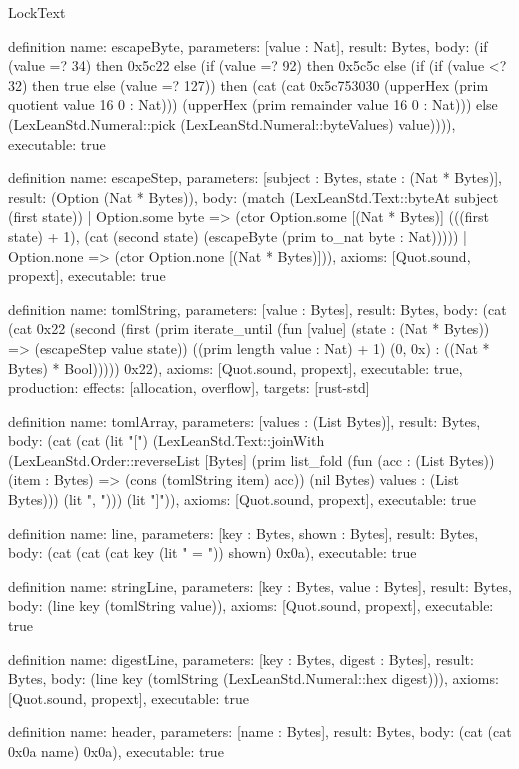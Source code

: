 \begin{lexlean}{LockText}
\begin{semanticmodule}
definition{
  name: escapeByte,
  parameters: [value : Nat],
  result: Bytes,
  body: (if (value =? 34) then 0x5c22 else (if (value =? 92) then 0x5c5c else (if (if (value <? 32) then true else (value =? 127)) then (cat (cat 0x5c753030 (upperHex (prim quotient value 16 0 : Nat))) (upperHex (prim remainder value 16 0 : Nat))) else (LexLeanStd.Numeral::pick (LexLeanStd.Numeral::byteValues) value)))),
  executable: true
}

definition{
  name: escapeStep,
  parameters: [subject : Bytes, state : (Nat * Bytes)],
  result: (Option (Nat * Bytes)),
  body: (match (LexLeanStd.Text::byteAt subject (first state))
    | Option.some byte => (ctor Option.some [(Nat * Bytes)] (((first state) + 1), (cat (second state) (escapeByte (prim to_nat byte : Nat)))))
    | Option.none => (ctor Option.none [(Nat * Bytes)])),
  axioms: [Quot.sound, propext],
  executable: true
}

definition{
  name: tomlString,
  parameters: [value : Bytes],
  result: Bytes,
  body: (cat (cat 0x22 (second (first (prim iterate_until (fun [value] (state : (Nat * Bytes)) => (escapeStep value state)) ((prim length value : Nat) + 1) (0, 0x) : ((Nat * Bytes) * Bool))))) 0x22),
  axioms: [Quot.sound, propext],
  executable: true,
  production: {effects: [allocation, overflow], targets: [rust-std]}
}

definition{
  name: tomlArray,
  parameters: [values : (List Bytes)],
  result: Bytes,
  body: (cat (cat (lit "[") (LexLeanStd.Text::joinWith (LexLeanStd.Order::reverseList [Bytes] (prim list_fold (fun (acc : (List Bytes)) (item : Bytes) => (cons (tomlString item) acc)) (nil Bytes) values : (List Bytes))) (lit ", "))) (lit "]")),
  axioms: [Quot.sound, propext],
  executable: true
}

definition{
  name: line,
  parameters: [key : Bytes, shown : Bytes],
  result: Bytes,
  body: (cat (cat (cat key (lit " = ")) shown) 0x0a),
  executable: true
}

definition{
  name: stringLine,
  parameters: [key : Bytes, value : Bytes],
  result: Bytes,
  body: (line key (tomlString value)),
  axioms: [Quot.sound, propext],
  executable: true
}

definition{
  name: digestLine,
  parameters: [key : Bytes, digest : Bytes],
  result: Bytes,
  body: (line key (tomlString (LexLeanStd.Numeral::hex digest))),
  axioms: [Quot.sound, propext],
  executable: true
}

definition{
  name: header,
  parameters: [name : Bytes],
  result: Bytes,
  body: (cat (cat 0x0a name) 0x0a),
  executable: true
}


\end{semanticmodule}
\end{lexlean}
